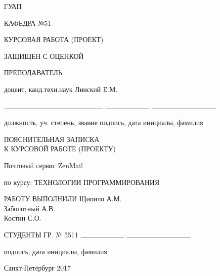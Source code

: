 \documentclass{article}
\begin{document}
    \begin{titlepage}
        \begin{center}
            ГУАП
            \vspace{0.25cm}

            КАФЕДРА №51
        \end{center}

        \begin{flushleft}

            КУРСОВАЯ РАБОТА (ПРОЕКТ)

            ЗАЩИЩЕН С ОЦЕНКОЙ

            ПРЕПОДАВАТЕЛЬ


            \vspace{0.5cm}
            
            доцент, канд.техн.наук \hspace{10.5cm} Линский Е.М.

            $\rule{5cm}{0.15mm}$ \hfill $\rule{2.2cm}{0.15mm}$  \hfill $\rule{3.25cm}{0.15mm}$

            должность, уч. степень, звание \hfill подпись, дата \hfill инициалы, фамилия
        \end{flushleft}

		\vspace{2cm}

        \begin{center}
            ПОЯСНИТЕЛЬНАЯ ЗАПИСКА\\
			К КУРСОВОЙ РАБОТЕ (ПРОЕКТУ)


            \vspace{1cm}
			
			Почтовый сервис ZenMail

            \vspace{1cm}

            по курсу: ТЕХНОЛОГИИ ПРОГРАММИРОВАНИЯ {\MakeUppercase{}}
        \end{center}

        \vspace{6cm}

        \begin{flushleft}
            РАБОТУ ВЫПОЛНИЛИ \hspace{10.55cm} Щипило А.М.\\
            \hspace{14.25cm} Заболотный А.В.\\
    		\hspace{15cm} Костин С.О.

            СТУДЕНТЫ ГР. № 5511 \hfill $\rule{2.2cm}{0.15mm}$  \hfill $\rule{3.25cm}{0.15mm}$

            \hspace{7.8cm} подпись, дата \hfill инициалы, фамилия
        \end{flushleft}

        \vspace{3cm}
        \begin{center}
            Санкт-Петербург 2017
        \end{center}
    \end{titlepage}
        
\end{document}

